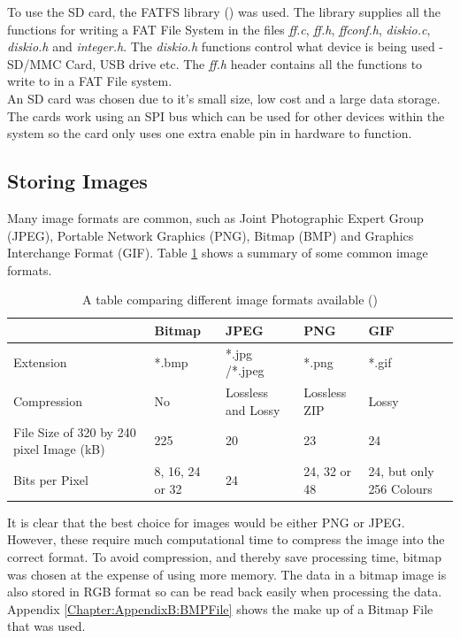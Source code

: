 To use the SD card, the FATFS library (\cite{FATFS}) was used. The library supplies all the functions for writing a FAT File System in the files \textit{ff.c}, \textit{ff.h}, \textit{ffconf.h}, \textit{diskio.c}, \textit{diskio.h} and \textit{integer.h}. The \textit{diskio.h} functions control what device is being used - SD/MMC Card, USB drive etc. The \textit{ff.h} header contains all the functions to write to in a FAT File system. 
\\
An SD card was chosen due to it's small size, low cost and a large data storage. The cards work using an SPI bus which can be used for other devices within the system so the card only uses one extra enable pin in hardware to function. 

\subsection{Storing Images}

Many image formats are common, such as Joint Photographic Expert Group (JPEG), Portable Network Graphics (PNG), Bitmap (BMP) and Graphics Interchange Format (GIF). Table \ref{ImageFormats} shows a summary of some common image formats.


\begin{table}
\centering
\begin{tabular}{|p{3cm}| p{3cm}|p{3cm}|p{3cm}|p{3cm}|} \hline
			&	Bitmap 		& 	JPEG			 	&	PNG				& 	GIF \\ \hline
Extension 		& 	*.bmp 		&  	*.jpg /*.jpeg 		& 	*.png				& 	*.gif \\ \hline
Compression 	& 	No 			& 	Lossless  and Lossy		&	Lossless ZIP			&	Lossy	\\\hline
File Size of 320 by 
240 pixel Image (kB) &	225			&	20				&	23				&	24 \\\hline
Bits per Pixel		&	8, 16, 24 or 32	&	24				&	24, 32 or 48 			& 	24, but only 256 Colours \\


\hline
\end{tabular}
\caption{A table comparing different image formats available (\cite{ImageComparison})}
\label{ImageFormats}
\end{table}

It is clear that the best choice for images would be either PNG or JPEG. However, these require much computational time to compress the image into the correct format. To avoid compression, and thereby save processing time, bitmap was chosen at the expense of using more memory. The data in a bitmap image is also stored in RGB format so can be read back easily when processing the data. Appendix \ref{Chapter:AppendixB:BMPFile} shows the make up of a Bitmap File that was used.

